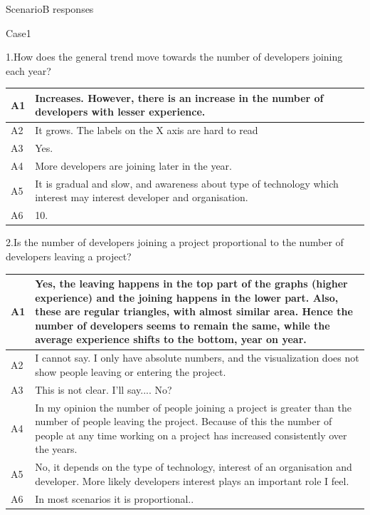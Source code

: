 \documentclass[double,12pt]{beavtex}
\begin{document}
ScenarioB responses


Case1


1.How does the general trend move towards the number of developers joining each year?	


\begin{tabular}{ |p{2cm}|p{12cm}| }
 \hline
 A1 & Increases. However, there is an increase in the number of developers with lesser experience.\\
 \hline
 A2 & It grows. The labels on the X axis are hard to read
\\ \hline
 A3 & Yes.\\ \hline
 A4 & More developers are joining later in the year.\\ \hline
 A5 & It is gradual and slow, and awareness about type of technology which interest may interest developer and organisation.\\ \hline
 A6 & 10.\\
 \hline
\end{tabular}


2.Is the number of developers joining a project proportional to the number of developers leaving a project?	


\begin{tabular}{ |p{2cm}|p{12cm}| }
 \hline
 A1 & Yes, the leaving happens in the top part of the graphs (higher experience) and the joining happens in the lower part. Also, these are regular triangles, with almost similar area. Hence the number of developers seems to remain the same, while the average experience shifts to the bottom, year on year.\\
 \hline
 A2 & I cannot say. I only have absolute numbers, and the visualization does not show people leaving or entering the project.\\ \hline
 A3 & This is not clear. I'll say.... No?\\ \hline
 A4 & In my opinion the number of people joining a project is greater than the number of people leaving the project. Because of this the number of people at any time working on a project has increased consistently over the years.\\ \hline
 A5 & No, it depends on the type of technology, interest of an organisation and developer. More likely developers interest plays an important role I feel.\\ \hline
 A6 & In most scenarios it is proportional..\\
 \hline
\end{tabular}
\end{document}
